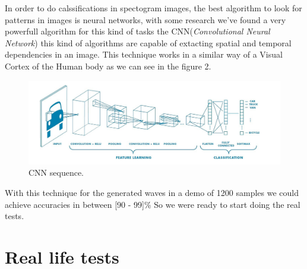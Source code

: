 \documentclass[conference]{IEEEtran}
\begin{document}
In order to do calssifications in spectogram images, the best algorithm to look for patterns in images is neural networks, with some research we've found a very powerfull algorithm for this kind of tasks the CNN({\it Convolutional Neural Network}) this kind of algorithms are capable of extacting spatial and temporal dependencies in an image. This technique works in a similar way of a Visual Cortex of the Human body as we can see in the figure 2.
\begin{figure}[htbp]
\centerline{\includegraphics[scale=0.19]{cnndemo.png}}
\caption{CNN sequence.}
\label{fig}
\end{figure}
With this technique for the generated waves in a demo of 1200 samples we could achieve accuracies in between [{90 - 99}]{\%} So we were ready to start doing the real tests.

\section{Real life tests}
\end{document}
